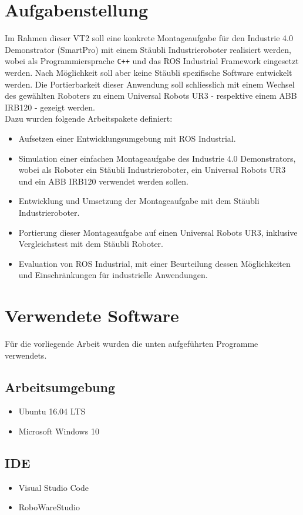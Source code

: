 \section{Aufgabenstellung}
\label{sec:Aufgabenstellung}
Im Rahmen dieser VT2 soll eine konkrete Montageaufgabe für den Industrie 4.0 Demonstrator (SmartPro) mit einem Stäubli Industrieroboter realisiert werden, wobei als Programmiersprache \verb!C++! und das ROS Industrial Framework eingesetzt werden. Nach Möglichkeit soll aber keine Stäubli spezifische Software entwickelt werden. Die Portierbarkeit dieser Anwendung soll schliesslich mit einem Wechsel des gewählten Roboters zu einem Universal Robots UR3 - respektive einem ABB IRB120 - gezeigt werden.\\
Dazu wurden folgende Arbeitspakete definiert:
\begin{itemize}
	\item Aufsetzen einer Entwicklungsumgebung mit ROS Industrial.
	\item Simulation einer einfachen Montageaufgabe des Industrie 4.0 Demonstrators, wobei als Roboter ein Stäubli Industrieroboter, ein Universal Robots UR3 und ein ABB IRB120 verwendet werden sollen.
	\item Entwicklung und Umsetzung der Montageaufgabe mit dem Stäubli Industrieroboter.
	\item Portierung dieser Montageaufgabe auf einen Universal Robots UR3, inklusive Vergleichstest mit dem Stäubli Roboter.
	\item Evaluation von ROS Industrial, mit einer Beurteilung dessen Möglichkeiten und Einschränkungen für industrielle Anwendungen.	 
\end{itemize}

\section{Verwendete Software}
\label{sec:VerwendeteSoftware}
Für die vorliegende Arbeit wurden die unten aufgeführten Programme verwendets.

\subsection*{Arbeitsumgebung}\label{wintool}
\begin{itemize}
	\item Ubuntu 16.04 LTS
	\item Microsoft Windows 10
\end{itemize}

\subsection*{IDE}
\begin{itemize}
	\item Visual Studio Code
	\item RoboWareStudio
\end{itemize}

